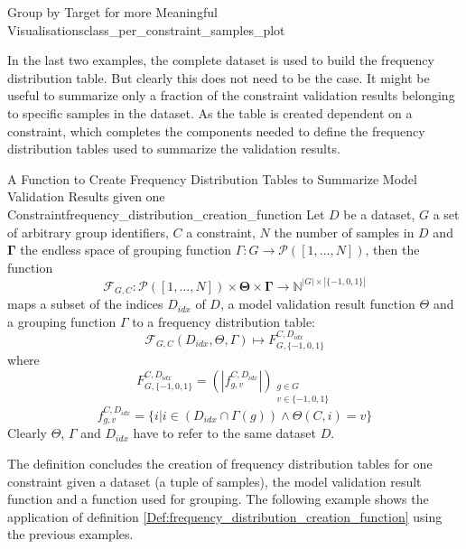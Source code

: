 \begin{Bsp}{Group by Target for more Meaningful Visualisations}{class_per_constraint_samples_plot}
\begin{minipage}[t]{\linewidth}
            \label{fig:class_per_constraint_samples_plot}
        \end{minipage}
\end{Bsp}

In the last two examples, the complete dataset is used to build the frequency distribution table. But clearly this does not need to be the case. It might be useful to summarize only a fraction of the constraint validation results belonging to specific samples in the dataset. As the table is created dependent on a constraint, which completes the components needed to define the frequency distribution tables used to summarize the validation results.

\begin{Def}{A Function to Create Frequency Distribution Tables to Summarize Model Validation Results given one Constraint}{frequency_distribution_creation_function}
Let $D$ be a dataset, $G$ a set of arbitrary group identifiers, $C$ a constraint, $N$ the number of samples in $D$ and $\mathbf{\Gamma}$ the endless space of grouping function $\Gamma: G \to \mathcal{P}([1,...,N])$, then the function \[\mathcal{F}_{G,C}: \mathcal{P}([1,...,N]) \times \mathbf{\Theta} \times \mathbf{\Gamma} \to \mathbb{N}^{|G| \times |\{-1,0,1\}|}\] maps a subset of the indices $D_{idx}$ of $D$, a model validation result function $\Theta$ and a grouping function $\Gamma$ to a frequency distribution table:
 \[\mathcal{F}_{G,C}(D_{idx},\Theta, \Gamma) \mapsto F_{G,\{-1,0,1\}}^{C,D_{idx}}\]
 where
 \[F_{G,\{-1,0,1\}}^{C,D_{idx}} = \left(\left|f_{g,v}^{C,D_{idx}}\right|\right)_{\substack{g \in G\\ v \in \{-1,0,1\}}}\]
 \[f_{g,v}^{C,D_{idx}} = \{ i | i \in (D_{idx} \cap \Gamma(g)) \land \Theta(C,i) = v\}\]
Clearly $\Theta$, $\Gamma$ and $D_{idx}$ have to refer to the same dataset $D$.
\end{Def}

The definition concludes the creation of frequency distribution tables for one constraint given a dataset (a tuple of samples), the model validation result function and a function used for grouping. The following example shows the application of definition \ref{Def:frequency_distribution_creation_function} using the previous examples.

